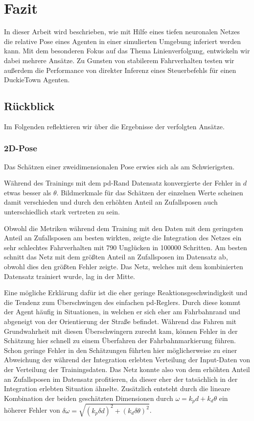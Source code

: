 \chapter{Fazit}

In dieser Arbeit wird beschrieben, wie mit Hilfe eines tiefen neuronalen Netzes die relative Pose eines Agenten in einer simulierten Umgebung inferiert werden kann. Mit dem besonderen Fokus auf das Thema Linienverfolgung, entwickeln wir dabei mehrere Ansätze. Zu Gunsten von stabilerem Fahrverhalten testen wir außerdem die Performance von direkter Inferenz eines Steuerbefehls für einen DuckieTown Agenten.

\section{Rückblick}

Im Folgenden reflektieren wir über die Ergebnisse der verfolgten Ansätze.

\subsection{2D-Pose}

Das Schätzen einer zweidimensionalen Pose erwies sich als am Schwierigsten.

Während des Trainings mit dem \glqq\acs{pd}\grqq-Rand Datensatz konvergierte der Fehler in $d$ etwas besser als $\theta$. Bildmerkmale für das Schätzen der einzelnen Werte scheinen damit verschieden und durch den erhöhten Anteil an Zufallsposen auch unterschiedlich stark vertreten zu sein.

Obwohl die Metriken während dem Training mit den Daten mit dem geringsten Anteil an Zufallsposen am besten wirkten, zeigte die Integration des Netzes ein sehr schlechtes Fahrverhalten mit 790 Unglücken in 100000 Schritten. Am besten schnitt das Netz mit dem größten Anteil an Zufallsposen im Datensatz ab, obwohl dies den größten Fehler zeigte. Das Netz, welches mit dem kombinierten Datensatz trainiert wurde, lag in der Mitte.

Eine mögliche Erklärung dafür ist die eher geringe Reaktionsgeschwindigkeit und die Tendenz zum Überschwingen des einfachen \acs{pd}-Reglers. Durch diese kommt der Agent häufig in Situationen, in welchen er sich eher am Fahrbahnrand und abgeneigt von der Orientierung der Straße befindet. Während das Fahren mit Grundwahrheit mit diesen Überschwingern zurecht kam, können Fehler in der Schätzung hier schnell zu einem Überfahren der Fahrbahnmarkierung führen. Schon geringe Fehler in den Schätzungen führten hier möglicherweise zu einer Abweichung der während der Integration erlebten Verteilung der Input-Daten von der Verteilung der Trainingsdaten. Das Netz konnte also von dem erhöhten Anteil an Zufallsposen im Datensatz profitieren, da dieser eher der tatsächlich in der Integration erlebten Situation ähnelte. Zusätzlich entsteht durch die lineare Kombination der beiden geschätzten Dimensionen durch $\omega = k_p d + k_d \theta$ ein höherer Fehler von $\delta\omega = \sqrt{(k_p\delta d)^2 + (k_d\delta \theta)^2}$.

